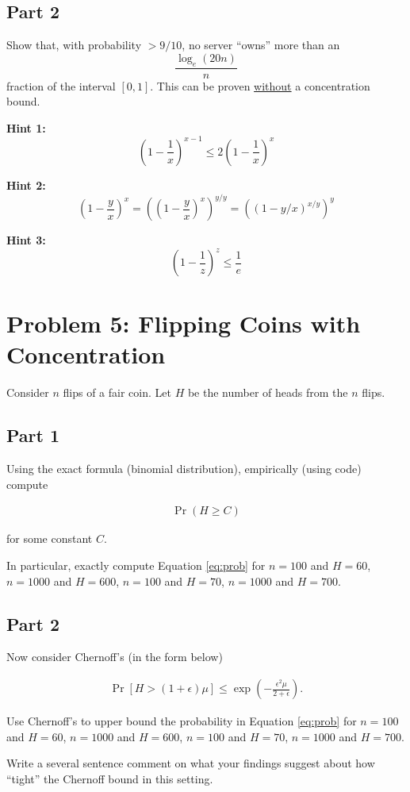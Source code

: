\documentclass{article}
\begin{document}
\subsection*{Part 2}
Show that, with probability $>9/10$, no server ``owns'' more than an $$\frac{\log_e (20 n)}{n}$$ fraction of the interval $[0,1]$. 
This can be proven \underline{without} a concentration bound.

\textbf{Hint 1:} $$\left(1-\frac1{x}\right)^{x-1} \leq 2\left(1-\frac1{x}\right)^x$$

\textbf{Hint 2:} $$\left(1-\frac{y}{x}\right)^x=\left(\left(1-\frac{y}{x}\right)^x\right)^{y/y} = \left(\left(1-y/x\right)^{x/y}\right)^y$$

\textbf{Hint 3:} $$\left(1-\frac1{z}\right)^z \leq \frac1{e}$$

%

\section*{Problem 5: Flipping Coins with Concentration}

Consider $n$ flips of a fair coin. Let $H$ be the number of heads from the $n$ flips.

\subsection*{Part 1}

Using the exact formula (binomial distribution), empirically (using code) compute 

\begin{align}\label{eq:prob}
\Pr( H \geq C)
\end{align}

for some constant $C$.

In particular, exactly compute Equation \ref{eq:prob} for $n=100$ and $H=60$, $n=1000$ and $H=600$, $n=100$ and $H=70$, $n=1000$ and $H=700$.

\subsection*{Part 2}
Now consider Chernoff's (in the form below)

\begin{align*}
	\Pr[H > (1+\epsilon)\mu] \leq \exp \left(-\frac{\epsilon^2\mu}{2+\epsilon}\right).
\end{align*}

Use Chernoff's to upper bound the probability in Equation \ref{eq:prob} for $n=100$ and $H=60$, $n=1000$ and $H=600$, $n=100$ and $H=70$, $n=1000$ and $H=700$.

Write a several sentence comment on what your findings suggest about how ``tight'' the Chernoff bound in this setting.

%
\end{document}
